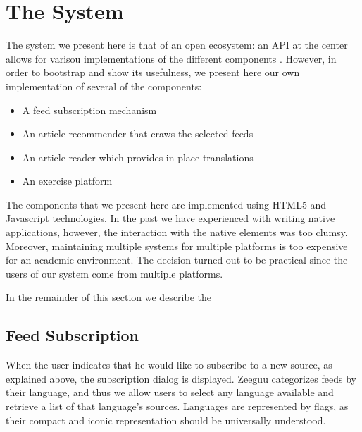 
\newpage
\section{The System}

The system we present here is that of an open ecosystem: an API at the center allows for varisou implementations of the different components \cite{Lungu16}. However, in order to bootstrap and show its usefulness, we present here our own implementation of several of the components: 

\begin{itemize}
  \item A feed subscription mechanism
  \item An article recommender that craws the selected feeds
  \item An article reader which provides-in place translations
  \item An exercise platform 
\end{itemize}

The components that we present here are implemented using HTML5 and Javascript technologies. In the past we have experienced with writing native applications, however, the interaction with the native elements was too clumsy. Moreover, maintaining multiple systems for multiple platforms is too expensive for an academic environment. The decision turned out to be practical since the users of our system come from multiple platforms.


In the remainder of this section we describe the 


\subsection {Feed Subscription}

When the user indicates that he would like to subscribe to a new source, as explained above, the subscription dialog is displayed. Zeeguu categorizes feeds by their language, and thus we allow users to select any language available and retrieve a list of that language’s sources. Languages are represented by flags, as their compact and iconic representation should be universally understood.

